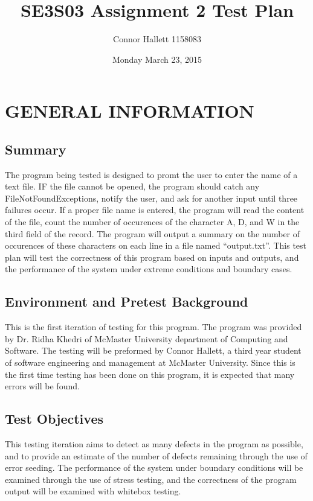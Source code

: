 \documentclass[]{article}
\title{SE3S03 Assignment 2 Test Plan}
\author{Connor Hallett 1158083}
\date{Monday March 23, 2015}
\begin{document}
\maketitle	

\section{GENERAL INFORMATION}
\label{sec:introduction}

\subsection{Summary}
\label{sub:purpose}
The program being tested is designed to promt the user to enter the name of a
text file.  IF the file cannot be opened, the program should catch any
FileNotFoundExceptions, notify the user, and ask for another input until three
failures occur.  If a proper file name is entered, the program will read the
content of the file, count the number of occurences of the character A, D, and W
in the third field of the record.  The program will output a summary on the
number of occurences of these characters on each line in a file named
``output.txt''.  This test plan will test the correctness of this program based
on inputs and outputs, and the performance of the system under extreme
conditions and boundary cases.

\subsection{Environment and Pretest Background}
\label{sub:scope}
This is the first iteration of testing for this program.  The program was
provided by Dr. Ridha Khedri of McMaster University department of Computing and
Software.  The testing will be preformed by Connor Hallett, a third year student
of software engineering and management at McMaster University.  Since this is
the first time testing has been done on this program, it is expected that many
errors will be found.

\subsection{Test Objectives}
\label{sub:definitions_acronyms_and_abbreviations}
This testing iteration aims to detect as many defects in the program as
possible, and to provide an estimate of the number of defects remaining through
the use of error seeding. The performance of the system under boundary
conditions will be examined through the use of stress testing, and the
correctness of the program output will be examined with whitebox testing.
\end{document}
